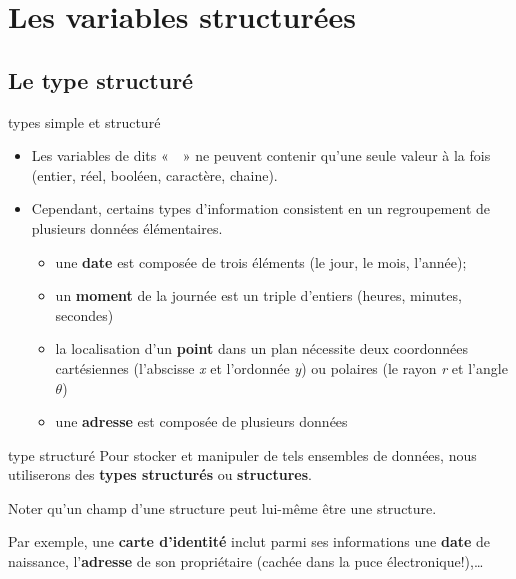 \section{Les variables structurées}

\subsection{Le type structuré}

\begin{frame}{types simple et structuré}
	\begin{itemize}
		\item
		Les variables de 
		dits «~~» ne peuvent
		contenir qu’une seule valeur à la fois  
		(entier, réel, booléen, caractère, chaine).
		
		\bigskip
	
		\item
		Cependant, certains types
		d’information consistent en un 
		regroupement de plusieurs données
		élémentaires.
		\begin{itemize}
			\item 
				une \textbf{date} est composée de trois éléments (le jour, le mois,
				l’année);
			\item {
				un \textbf{moment} de la journée est un triple d’entiers (heures,
				minutes, secondes)}
			\item {
				la localisation d’un \textbf{point} dans un plan nécessite 
				deux coordonnées cartésiennes (l’abscisse \textit{x} et
				l’ordonnée \textit{y}) ou polaires (le rayon \textit{r} et l’angle
				\textit{$\theta $})}
			\item {
				une \textbf{adresse }est composée de plusieurs données}
		\end{itemize}
		
	\end{itemize}
\end{frame}

\begin{frame}{type structuré}
	Pour stocker et manipuler de tels ensembles de données, nous utiliserons
	des \textbf{types structurés} ou \textbf{structures}.
	
	\bigskip
	
	
	\bigskip
	
	Noter qu’un champ d’une structure peut lui-même être une structure. 
	
	Par	exemple, une \textbf{carte d’identité} inclut parmi ses informations
	une \textbf{date} de naissance, l’\textbf{adresse} de son
	propriétaire (cachée dans la puce électronique!),\dots
\end{frame}

